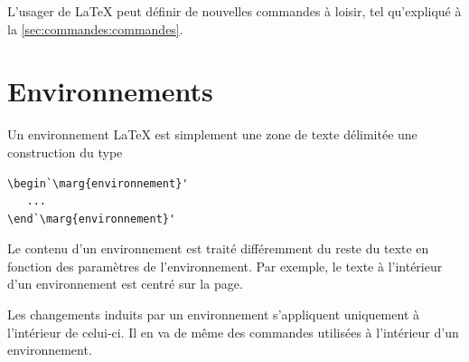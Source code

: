 L'usager de {\LaTeX} peut définir de nouvelles commandes à loisir, tel
qu'expliqué à la \autoref{sec:commandes:commandes}.


\section{Environnements}
\label{chap:bases:environnements}

Un environnement {\LaTeX} est simplement une zone de texte délimitée
une construction du type
\begin{lstlisting}
\begin`\marg{environnement}'
   ...
\end`\marg{environnement}'
\end{lstlisting}
Le contenu d'un environnement est traité différemment du reste du
texte en fonction des paramètres de l'environnement. Par exemple, le
texte à l'intérieur d'un environnement  est centré sur la
page.

Les changements induits par un environnement s'appliquent uniquement à
l'intérieur de celui-ci. Il en va de même des commandes utilisées à
l'intérieur d'un environnement.

